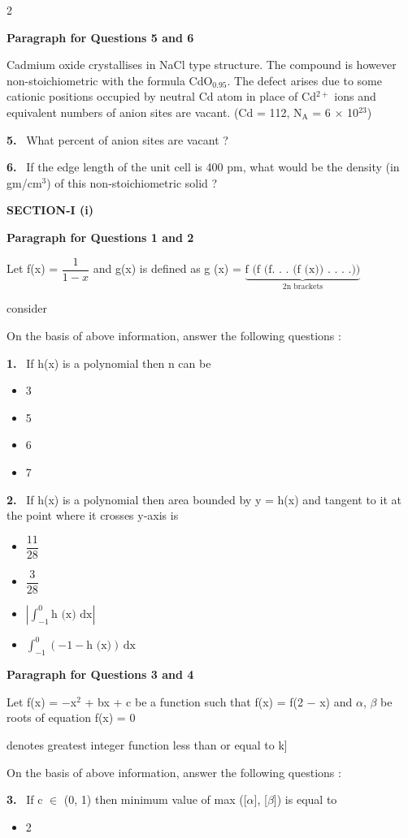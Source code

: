 \documentclass[10pt]{extarticle}
\newcommand{\partsec}[2]{\par\medskip\noindent{\large\bfseries PART-#1: #2}\par\smallskip}
\newcommand{\sect}[1]{\par\smallskip\noindent\textbf{#1}\par}
\newcommand{\qn}[1]{\par\smallskip\noindent\textbf{#1.}~}
\newcommand{\paraq}[2]{\par\smallskip\noindent\textbf{Paragraph for Questions #1 and #2}\par}
\newenvironment{qoptions}{\begin{itemize}[leftmargin=1.8em,itemsep=1pt,topsep=2pt,label={}]}{\end{itemize}}
\newcommand{\opt}[2]{\item[(#1)] #2}
\begin{document}
\begin{multicols}{2}
\paraq{5}{6}Cadmium oxide crystallises in NaCl type structure. The compound is however non-stoichiometric with the formula CdO$_{0.95}$. The defect arises due to some cationic positions occupied by neutral Cd atom in place of Cd$^{2+}$ ions and equivalent numbers of anion sites are vacant. (Cd = 112, N$_\text{A}$ = 6 $\times$ 10$^{23}$)\par
\qn{5} What percent of anion sites are vacant ?\par
\qn{6} If the edge length of the unit cell is 400 pm, what would be the density (in gm/cm$^3$) of this non-stoichiometric solid ?\par
\raggedcolumns
\partsec{3}{MATHEMATICS}
\sect{SECTION-I (i)}
\paraq{1}{2}Let f(x) = $\dfrac{1}{1-x}$ and g(x) is defined as g (x) = $\underbrace{\text{f (f (f. . . (f (x)) . . . .))}}_{\text{2n brackets}}$\par
consider\par
{}\par
On the basis of above information, answer the following questions :\par
\qn{1} If h(x) is a polynomial then n can be
\begin{qoptions}
\opt{A}{3}
\opt{B}{5}
\opt{C}{6}
\opt{D}{7}
\end{qoptions}
\qn{2} If h(x) is a polynomial then area bounded by y = h(x) and tangent to it at the point where it crosses y-axis is
\begin{qoptions}
\opt{A}{$\dfrac{11}{28}$}
\opt{B}{$\dfrac{3}{28}$}
\opt{C}{$\left|\displaystyle\int_{-1}^{0}\text{h (x) dx}\right|$}
\opt{D}{$\displaystyle\int_{-1}^{0}(-1-\text{h (x)})\,\text{dx}$}
\end{qoptions}
\paraq{3}{4}Let f(x) = $-$x$^2$ + bx + c be a function such that f(x) = f(2 $-$ x) and $\alpha$, $\beta$ be roots of equation f(x) = 0\par
[Note : [k] denotes greatest integer function less than or equal to k]\par
On the basis of above information, answer the following questions :\par
\qn{3} If c $\in$ (0, 1) then minimum value of max ([$\alpha$], [$\beta$]) is equal to
\begin{qoptions}
\opt{A}{2}

\end{qoptions}
\end{multicols}
\end{document}
